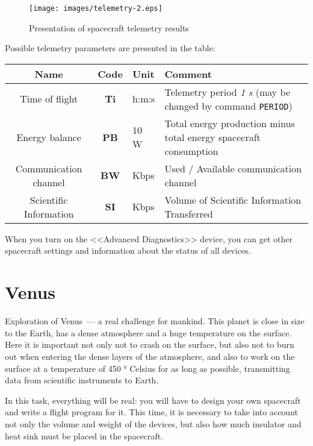 \documentclass[12pt,a4paper]{article}
\begin{document}
\begin{figure}[tbh]
  \begin{center}
    \texttt{[image: images/telemetry-2.eps]}
    \caption{Presentation of spacecraft telemetry results}
    \label{Pic:telemetry-2}
  \end{center}
\end{figure}

Possible telemetry parameters are presented in the table:

\begin{center}
\begin{tabular}{ |c|c|p{2.5cm}|p{6cm}| }
  \hline
  \textbf{Name} & \textbf{Code} & \textbf{Unit} & \textbf{Comment} \\
   \hline
   Time of flight & \textbf{Ti} & h:m:s & Telemetry period \emph{1 s} (may be
   changed by command \verb'PERIOD')\\
   \hline
   Energy balance & \textbf{PB} & 10 W & Total energy production minus total energy
   spacecraft consumption\\
   \hline
   Communication channel & \textbf{BW} & Kbps & Used / Available communication channel\\
   \hline
   Scientific Information & \textbf{SI} & Kbps & Volume of Scientific Information Transferred\\
   \hline
\end{tabular}
\end{center}

When you turn on the <<Advanced Diagnostics>> device, you can get other spacecraft settings and information about the status of all devices.

\section{Venus}

Exploration of Venus~--- a real challenge for mankind. This planet is close in size to the Earth, has a dense atmosphere and a huge temperature on the surface. Here it is important not only not to crash on the surface, but also not to burn out when entering the dense layers of the atmosphere, and also to work on the surface at a temperature of 450 ° Celsius for as long as possible, transmitting data from scientific instruments to Earth.

In this task, everything will be real: you will have to design your own spacecraft and write a flight program for it. This time, it is necessary to take into account not only the volume and weight of the devices, but also how much insulator and heat sink must be placed in the spacecraft.
\end{document}
